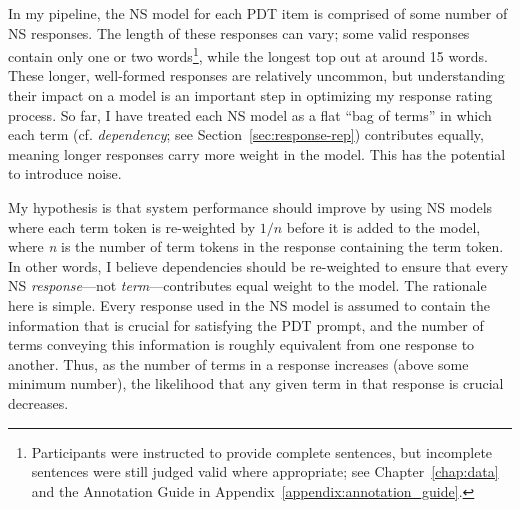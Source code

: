 In my pipeline, the NS model for each PDT item is comprised of some number of NS responses.  The length of these responses can vary; some valid responses contain only one or two words\footnote{Participants were instructed to provide complete sentences, but incomplete sentences were still judged valid where appropriate; see Chapter~\ref{chap:data} and the Annotation Guide in Appendix~\ref{appendix:annotation_guide}.}, while the longest top out at around 15 words. These longer, well-formed responses are relatively uncommon, but understanding their impact on a model is an important step in optimizing my response rating process. So far, I have treated each NS model as a flat ``bag of terms'' in which each term (cf. \textit{dependency}; see Section~\ref{sec:response-rep}) contributes equally, meaning longer responses carry more weight in the model. This has the potential to introduce noise. 

My hypothesis is that system performance should improve by using NS models where each term token is re-weighted by $1/\textit{n}$ before it is added to the model, where \textit{n} is the number of term tokens in the response containing the term token. In other words, I believe dependencies should be re-weighted to ensure that every NS \textit{response}---not \textit{term}---contributes equal weight to the model. The rationale here is simple. Every response used in the NS model is assumed to contain the information that is crucial for satisfying the PDT prompt, and the number of terms conveying this information is roughly equivalent from one response to another. Thus, as the number of terms in a response increases (above some minimum number), the likelihood that any given term in that response is crucial decreases.


